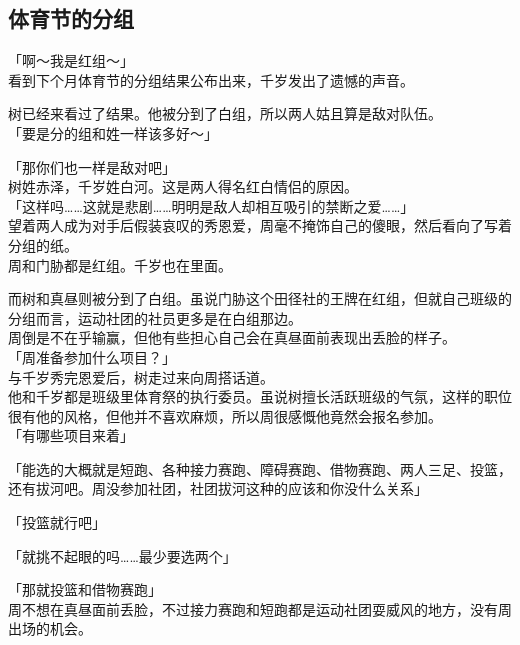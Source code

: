 \subsection{体育节的分组}

「啊～我是红组～」\\

看到下个月体育节的分组结果公布出来，千岁发出了遗憾的声音。

树已经来看过了结果。他被分到了白组，所以两人姑且算是敌对队伍。\\

「要是分的组和姓一样该多好～」

「那你们也一样是敌对吧」\\

树姓赤泽，千岁姓白河。这是两人得名红白情侣的原因。\\

「这样吗……这就是悲剧……明明是敌人却相互吸引的禁断之爱……」\\

望着两人成为对手后假装哀叹的秀恩爱，周毫不掩饰自己的傻眼，然后看向了写着分组的纸。\\

周和门胁都是红组。千岁也在里面。

而树和真昼则被分到了白组。虽说门胁这个田径社的王牌在红组，但就自己班级的分组而言，运动社团的社员更多是在白组那边。\\

周倒是不在乎输赢，但他有些担心自己会在真昼面前表现出丢脸的样子。\\

「周准备参加什么项目？」\\

与千岁秀完恩爱后，树走过来向周搭话道。\\

他和千岁都是班级里体育祭的执行委员。虽说树擅长活跃班级的气氛，这样的职位很有他的风格，但他并不喜欢麻烦，所以周很感慨他竟然会报名参加。\\

「有哪些项目来着」

「能选的大概就是短跑、各种接力赛跑、障碍赛跑、借物赛跑、两人三足、投篮，还有拔河吧。周没参加社团，社团拔河这种的应该和你没什么关系」

「投篮就行吧」

「就挑不起眼的吗……最少要选两个」

「那就投篮和借物赛跑」\\

周不想在真昼面前丢脸，不过接力赛跑和短跑都是运动社团耍威风的地方，没有周出场的机会。

